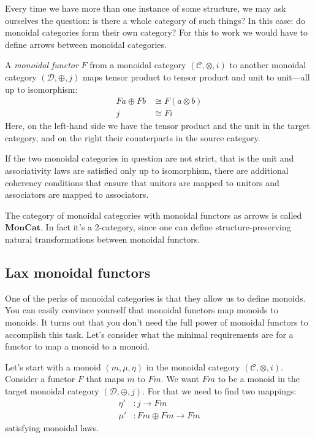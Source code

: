 \documentclass[DaoFP]{subfiles}
\begin{document}
Every time we have more than one instance of some structure, we may ask ourselves the question: is there a whole category of such things? In this case: do monoidal categories form their own category? For this to work we would have to define arrows between monoidal categories.

A \emph{monoidal functor} $F$ from a monoidal category $(\mathcal{C}, \otimes, i)$ to another monoidal category $(\mathcal{D}, \oplus, j)$ maps tensor product to tensor product and unit to unit---all up to isomorphism:
\begin{align*}
F a \oplus F b &\cong F (a \otimes b) \\
j &\cong F i 
\end{align*}
Here, on the left-hand side we have the tensor product and the unit in the target category, and on the right their counterparts in the source category. 

If the two monoidal categories in question are not strict, that is the unit and associativity laws are satisfied only up to isomorphism, there are additional coherency conditions that ensure that unitors are mapped to unitors and associators are mapped to associators.

The category of monoidal categories with monoidal functors as arrows is called $\mathbf{MonCat}$. In fact it's a 2-category, since one can define structure-preserving natural transformations between monoidal functors.

\subsection{Lax monoidal functors}

One of the perks of monoidal categories is that they allow us to define monoids. You can easily convince yourself that monoidal functors map monoids to monoids. It turns out that you don't need the full power of monoidal functors to accomplish this task. Let's consider what the minimal requirements are  for a functor to map a monoid to a monoid. 

Let's start with a monoid $(m, \mu, \eta)$ in the monoidal category $(\mathcal{C}, \otimes, i)$. Consider a functor $F$ that maps $m$ to $F m$. We want $F m$ to be a monoid in the target monoidal category $(\mathcal{D}, \oplus, j)$. For that we need to find two mappings:
\begin{align*}
\eta' &\colon j \to F m \\
 \mu' &\colon F m \oplus F m \to F m 
\end{align*}
satisfying monoidal laws.
\end{document}
